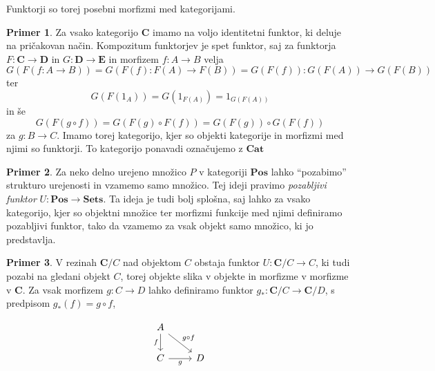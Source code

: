 \documentclass[12pt,a4paper]{book}
\theoremstyle{definition}
\theoremstyle{plain}
\theoremstyle{definition}
\newtheorem{primer}{Primer}[section]
\theoremstyle{remark}
\newcommand{\cat}[1]{\textbf{#1}}
\begin{document}
Funktorji so torej posebni morfizmi med kategorijami.

\begin{primer}
Za vsako kategorijo $\cat{C}$ imamo na voljo identitetni funktor, ki deluje na pričakovan način. Kompozitum funktorjev je spet funktor, saj za funktorja $F : \cat{C} \to \cat{D}$ in $G : \cat{D} \to \cat{E}$ in morfizem $f : A \to B$ velja
$$G(F(f : A \to B)) = G(F(f) : F(A) \to F(B)) = G(F(f)) : G(F(A)) \to G(F(B))$$
ter
$$G(F(1_A)) = G(1_{F(A)}) = 1_{G(F(A))}$$
in še
$$G(F(g \circ f)) = G(F(g) \circ F(f)) = G(F(g)) \circ G(F(f))$$
za $g : B \to C$. Imamo torej kategorijo, kjer so objekti kategorije in morfizmi med njimi so funktorji. To kategorijo ponavadi označujemo z $\cat{Cat}$ 
\end{primer}

\begin{primer}
Za neko delno urejeno množico $P$ v kategoriji $\cat{Pos}$ lahko "`pozabimo"' strukturo urejenosti in vzamemo samo množico. Tej ideji pravimo \emph{pozabljivi funktor} $U : \cat{Pos} \to \cat{Sets}$. Ta ideja je tudi bolj splošna, saj lahko za vsako kategorijo, kjer so objektni množice ter morfizmi funkcije med njimi definiramo pozabljivi funktor, tako da vzamemo za vsak objekt samo množico, ki jo predstavlja.
\end{primer}

\begin{primer}
V rezinah $\cat{C}/C$ nad objektom $C$ obstaja funktor $U : \cat{C}/C \to C$, ki tudi pozabi na gledani objekt $C$, torej objekte slika v objekte in morfizme v morfizme v $\cat{C}$. Za vsak morfizem $g : C \to D$ lahko definiramo funktor $g_* : \cat{C}/C \to \cat{C}/D$, s predpisom $g_*(f) = g \circ f$,

$$\begin{tikzcd}
A \ar[d, "f"'] \ar[dr, "g \circ f"] & \\
C \ar[r, "g"'] & D \\
\end{tikzcd}$$

\end{primer}
\end{document}
